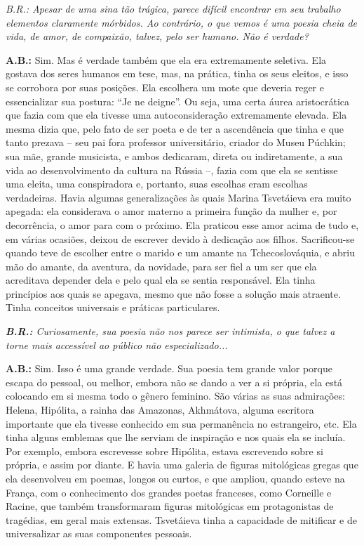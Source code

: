 \emph{B.R.: Apesar de uma sina tão trágica, parece difícil encontrar em
seu trabalho elementos claramente mórbidos. Ao contrário, o que vemos é
uma poesia cheia de vida, de amor, de compaixão, talvez, pelo ser
humano. Não é verdade?}

\textbf{A.B.:} Sim. Mas é verdade também que ela era extremamente
seletiva. Ela gostava dos seres humanos em tese, mas, na prática, tinha
os seus eleitos, e isso se corrobora por suas posições. Ela escolhera um
mote que deveria reger e essencializar sua postura: ``Je ne deigne''. Ou
seja, uma certa áurea aristocrática que fazia com que ela tivesse uma
autoconsideração extremamente elevada. Ela mesma dizia que, pelo fato de
ser poeta e de ter a ascendência que tinha e que tanto prezava -- seu
pai fora professor universitário, criador do Museu Púchkin; sua mãe,
grande musicista, e ambos dedicaram, direta ou indiretamente, a sua vida
ao desenvolvimento da cultura na Rússia --, fazia com que ela se
sentisse uma eleita, uma conspiradora e, portanto, suas escolhas eram
escolhas verdadeiras. Havia algumas generalizações às quais Marina
Tsvetáieva era muito apegada: ela considerava o amor materno a primeira
função da mulher e, por decorrência, o amor para com o próximo. Ela
praticou esse amor acima de tudo e, em várias ocasiões, deixou de
escrever devido à dedicação aos filhos. Sacrificou-se quando teve de
escolher entre o marido e um amante na Tchecoslováquia, e abriu mão do
amante, da aventura, da novidade, para ser fiel a um ser que ela
acreditava depender dela e pelo qual ela se sentia responsável. Ela
tinha princípios aos quais se apegava, mesmo que não fosse a solução
mais atraente. Tinha conceitos universais e práticas particulares.

\emph{\textbf{B.R.:} Curiosamente, sua poesia não nos parece ser
intimista, o que talvez a torne mais accessível ao público não
especializado...}

\textbf{A.B.:} Sim. Isso é uma grande verdade. Sua poesia tem grande
valor porque escapa do pessoal, ou melhor, embora não se dando a ver a
si própria, ela está colocando em si mesma todo o gênero feminino. São
várias as suas admirações: Helena, Hipólita, a rainha das Amazonas,
Akhmátova, alguma escritora importante que ela tivesse conhecido em sua
permanência no estrangeiro, etc. Ela tinha alguns emblemas que lhe
serviam de inspiração e nos quais ela se incluía. Por exemplo, embora
escrevesse sobre Hipólita, estava escrevendo sobre si própria, e assim
por diante. E havia uma galeria de figuras mitológicas gregas que ela
desenvolveu em poemas, longos ou curtos, e que ampliou, quando esteve na
França, com o conhecimento dos grandes poetas franceses, como Corneille
e Racine, que também transformaram figuras mitológicas em protagonistas
de tragédias, em geral mais extensas. Tsvetáieva tinha a capacidade de
mitificar e de universalizar as suas componentes pessoais.

